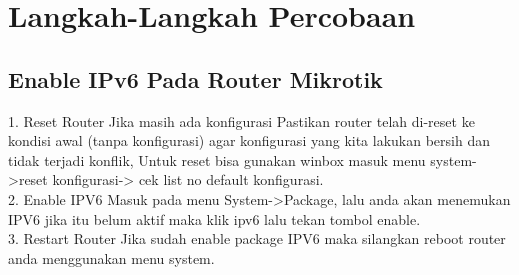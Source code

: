 \section{Langkah-Langkah Percobaan}
\subsection{Enable IPv6 Pada Router Mikrotik}
1. Reset Router Jika masih ada konfigurasi Pastikan router telah di-reset ke kondisi awal (tanpa konfigurasi) agar konfigurasi yang kita lakukan bersih dan tidak terjadi konflik, Untuk reset bisa gunakan winbox masuk menu system->reset konfigurasi-> cek list no default konfigurasi. \\ 
2. Enable IPV6 Masuk pada menu System->Package, lalu anda akan menemukan IPV6 jika itu belum aktif maka klik ipv6 lalu tekan tombol enable. \\
3. Restart Router Jika sudah enable package IPV6 maka silangkan reboot router anda menggunakan menu system.

